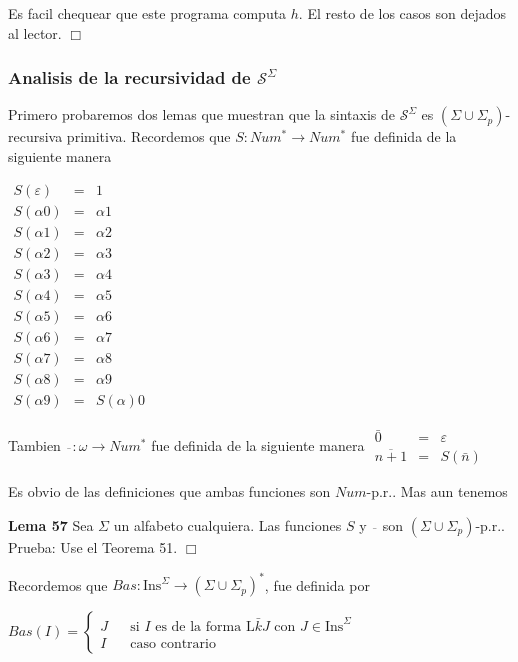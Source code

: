 Es facil chequear que este programa computa \(h.\)
El resto de los casos son dejados al lector. \(\Box\)


\subsubsection{Analisis de la recursividad de \(\mathcal{S}^{\Sigma }\)}

Primero probaremos dos lemas que muestran que la sintaxis de \(\mathcal{S} ^{\Sigma }\) es \((\Sigma \cup \Sigma _{p})\)-recursiva primitiva. Recordemos que \(S:Num^{\ast }\rightarrow Num^{\ast }\) fue definida de la siguiente manera

\(\displaystyle \begin{array}{rcl} S(\varepsilon ) & =& 1 \\ S(\alpha 0) & =& \alpha 1 \\ S(\alpha 1) & =& \alpha 2 \\ S(\alpha 2) & =& \alpha 3 \\ S(\alpha 3) & =& \alpha 4 \\ S(\alpha 4) & =& \alpha 5 \\ S(\alpha 5) & =& \alpha 6 \\ S(\alpha 6) & =& \alpha 7 \\ S(\alpha 7) & =& \alpha 8 \\ S(\alpha 8) & =& \alpha 9 \\ S(\alpha 9) & =& S(\alpha )0 \end{array} \)

Tambien \(\overline{\ \;}:\omega \rightarrow Num^{\ast }\) fue definida de la siguiente manera
\(\displaystyle \begin{array}{rcl} \bar{0} & =& \varepsilon \\ \overline{n+1} & =& S(\bar{n}) \end{array} \)

Es obvio de las definiciones que ambas funciones son \(Num\)-p.r.. Mas aun tenemos



\textbf{Lema 57} Sea \(\Sigma \) un alfabeto cualquiera. Las funciones \(S\) y \(\overline{\ \;}\) son \((\Sigma \cup \Sigma _{p})\)-p.r..
Prueba: Use el Teorema 51. \(\Box\)

Recordemos que \(Bas:\mathrm{Ins}^{\Sigma }\rightarrow (\Sigma \cup \Sigma _{p})^{\ast }\), fue definida por

\(\displaystyle Bas(I)=\left\{ \begin{array}{ccl} J & & \text{si }I\text{ es de la forma }\mathrm{L}\bar{k}J\text{ con }J\in \mathrm{Ins}^{\Sigma } \\ I & & \text{caso contrario} \end{array} \right. \)

